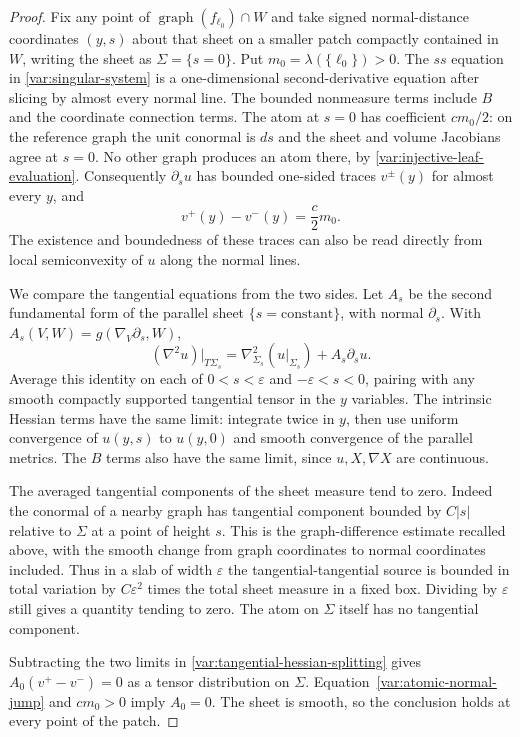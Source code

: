 \begin{proof}
Fix any point of $\operatorname{graph}(f_{\ell_0})\cap W$ and take
signed normal-distance coordinates $(y,s)$ about that sheet on a
smaller patch compactly contained in $W$, writing the sheet as
$\Sigma=\{s=0\}$.  Put $m_0=\lambda(\{\ell_0\})>0$.
The $ss$ equation in \eqref{var:singular-system} is a one-dimensional
second-derivative equation after slicing by almost every normal line.
The bounded nonmeasure terms include $B$ and the coordinate connection
terms.  The atom at $s=0$ has coefficient $cm_0/2$: on the reference graph
the unit conormal is $ds$ and the sheet and volume Jacobians agree at
$s=0$.  No other graph produces an atom there, by
\eqref{var:injective-leaf-evaluation}.  Consequently $\partial_su$ has
bounded one-sided traces $v^\pm(y)$ for almost every $y$, and
\begin{equation}\label{var:atomic-normal-jump}
 v^+(y)-v^-(y)=\frac c2m_0.
\end{equation}
The existence and boundedness of these traces can also be read directly
from local semiconvexity of $u$ along the normal lines.

We compare the tangential equations from the two sides.  Let $A_s$ be the
second fundamental form of the parallel sheet $\{s=\mathrm{constant}\}$,
with normal $\partial_s$.  With $A_s(V,W)=g(\nabla_V\partial_s,W)$,
\begin{equation}\label{var:tangential-hessian-splitting}
 (\nabla^2u)|_{T\Sigma_s}
   =\nabla^2_{\Sigma_s}(u|_{\Sigma_s})+A_s\partial_su.
\end{equation}
Average this identity on each of $0<s<\varepsilon$ and
$-\varepsilon<s<0$, pairing with any smooth compactly supported tangential
tensor in the $y$ variables.  The intrinsic Hessian terms have the same
limit: integrate twice in $y$, then use uniform convergence of
$u(y,s)$ to $u(y,0)$ and smooth convergence of the parallel metrics.
The $B$ terms also have the same limit, since $u,X,\nabla X$ are
continuous.

The averaged tangential components of the sheet measure tend to zero.
Indeed the conormal of a nearby graph has tangential component bounded by
$C|s|$ relative to $\Sigma$ at a point of height $s$.  This is the
graph-difference estimate recalled above, with the smooth change from
graph coordinates to normal coordinates included.  Thus in a slab of
width $\varepsilon$ the tangential-tangential source is bounded in total
variation by $C\varepsilon^2$ times the total sheet measure in a fixed
box.  Dividing by $\varepsilon$ still gives a quantity tending to zero.
The atom on $\Sigma$ itself has no tangential component.

Subtracting the two limits in
\eqref{var:tangential-hessian-splitting} gives
$A_0(v^+-v^-)=0$ as a tensor distribution on $\Sigma$.
Equation~\eqref{var:atomic-normal-jump} and $c m_0>0$ imply $A_0=0$.
The sheet is smooth, so the conclusion holds at every point of the patch.
\end{proof}

